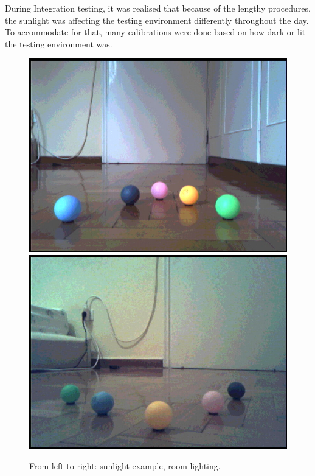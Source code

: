 \documentclass[a4paper]{article}
\begin{document}
    During Integration testing, it was realised that because of the lengthy procedures, the sunlight was affecting the testing environment differently
    throughout the day. To accommodate for that, many calibrations were done based on how dark or lit the testing environment was.
    \begin{figure}[H]
        \centering
        \includegraphics[scale=0.27]{./images/sunlight.jpg}
        \includegraphics[scale=0.27]{./images/no_sunlight_lamp.jpg}
        \vspace{-10pt}
        \caption{From left to right: sunlight example, room lighting.}
        \vspace{-10pt}
        \label{image:sunlight}
    \end{figure}
\end{document}
